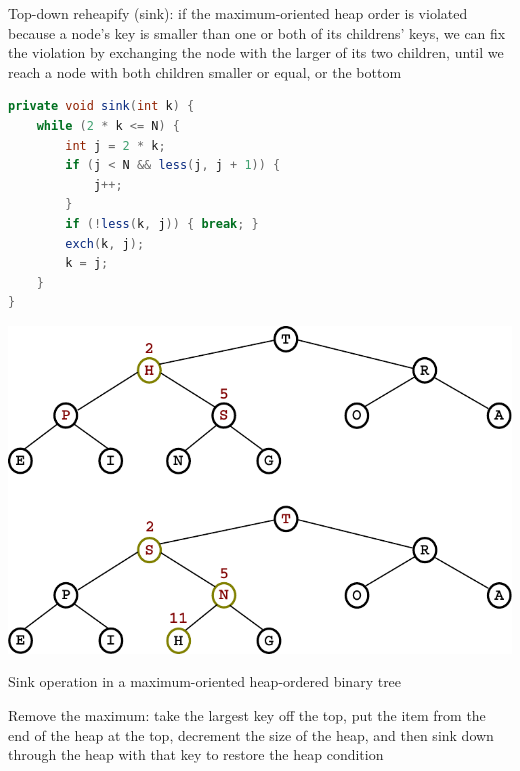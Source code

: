 \documentclass[8pt,a4paper,compress]{beamer}
\begin{document}
\begin{frame}[fragile]
Top-down reheapify (sink): if the maximum-oriented heap order is violated because a node's key is smaller than one or both of its childrens' keys, we can fix the violation by exchanging the node with the larger of its two children, until we reach a node with both children smaller or equal, or the bottom 

\bigskip

\begin{minipage}{150pt}
\begin{lstlisting}[language=Java]
private void sink(int k) {
    while (2 * k <= N) {
        int j = 2 * k;
        if (j < N && less(j, j + 1)) { 
            j++; 
        }
        if (!less(k, j)) { break; }
        exch(k, j);
        k = j;
    }
}
\end{lstlisting}
\end{minipage}%
\begin{minipage}{130pt}
\hfill \includegraphics[scale=0.35]{./figures/heapify_sink.pdf}
\end{minipage}

\smallskip

\begin{center}
\tiny Sink operation in a maximum-oriented heap-ordered binary tree
\end{center}

\bigskip

Remove the maximum: take the largest key off the top, put the item from the end of the heap at the top, decrement the size of the heap, and then sink down through the heap with that key to restore the heap condition
\end{frame}
\end{document}
